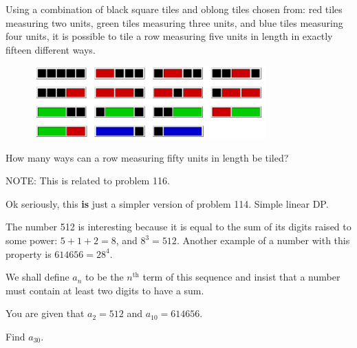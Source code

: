 


Using a combination of black square tiles and oblong tiles chosen from: red tiles measuring two units, green tiles measuring three units, and blue tiles measuring four units, it is possible to tile a row measuring five units in length in exactly fifteen different ways.
\vspace{-0.5cm}
\begin{center}
\begin{figure}[h]
\centering
\includegraphics[width = 0.80\textwidth]{./images/p_117.png}
\end{figure}
\end{center}
\vspace{-1.25cm}
How many ways can a row measuring fifty units in length be tiled?

\footnotesize
NOTE: This is related to problem 116.
\normalsize

Ok seriously, this \textbf{is} just a simpler version of problem 114.  Simple linear DP.






\ans{---}



The number 512 is interesting because it is equal to the sum of its digits raised to some power: $5 + 1 + 2 = 8$, and
$8^3 = 512$. Another example of a number with this property is $614656 = 28^4$.

We shall define $a_n$ to be the $n^\text{th}$ term of this sequence and insist that a number must contain at least two digits to have a sum.

You are given that $a_2 = 512$ and $a_{10} = 614656$.

Find $a_{30}$.


